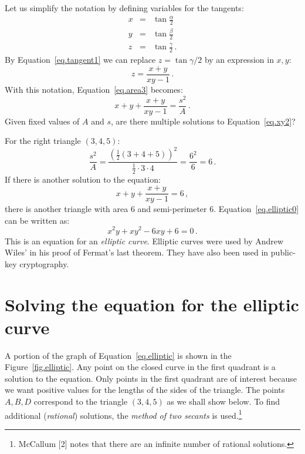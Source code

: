 \documentclass[11pt,a4paper]{article}
\begin{document}
Let us simplify the notation by defining variables for the tangents:
\begin{eqnarray*}
x&=&\tan \frac{\alpha}{2}\\
y&=&\tan \frac{\beta}{2}\\
z&=&\tan \frac{\gamma}{2}\,.
\end{eqnarray*}
By Equation~\ref{eq.tangent1} we can replace $z=\tan\gamma/2$ by an expression in $x,y$:
\begin{equation}
z = \frac{x+y}{xy-1}\,.\label{eq.xy1}
\end{equation}
With this notation, Equation~\ref{eq.area3} becomes:
\begin{equation}
x+y+\frac{x+y}{xy-1}=\frac{s^2}{A}\,.\label{eq.xy2}
\end{equation}
Given fixed values of $A$ and $s$, are there multiple solutions to Equation~\ref{eq.xy2}?

For the right triangle $(3,4,5)$:
\begin{equation}
\frac{s^2}{A} = \frac{\left(\frac{1}{2}(3+4+5)\right)^2}{\frac{1}{2}\cdot 3\cdot 4} = \frac{6^2}{6}=6\,.
\end{equation}
If there is another solution to the equation:
\begin{equation}
x+y+\frac{x+y}{xy-1}=6\,,\label{eq.elliptic0}
\end{equation}
there is another triangle with area $6$ and semi-perimeter $6$.
Equation~\ref{eq.elliptic0} can be written as:
\begin{equation}
x^2y + xy^2 -6xy + 6 = 0\,.\label{eq.elliptic}
\end{equation}
This is an equation for an \emph{elliptic curve}. Elliptic curves were used by Andrew Wiles' in his proof of Fermat's last theorem. They have also been used in public-key cryptography.

\section{Solving the equation for the elliptic curve}

A portion of the graph of Equation~\ref{eq.elliptic} is shown in the Figure~\ref{fig.elliptic}. Any point on the closed curve in the first quadrant is a solution to the equation. Only points in the first quadrant are of interest because we want positive values for the lengths of the sides of the triangle. The points $A,B,D$ correspond to the triangle $(3,4,5)$ as we shall show below. To find additional (\emph{rational}) solutions, the \emph{method of two secants} is used.\footnote{McCallum [2] notes that there are an infinite number of rational solutions.}
\end{document}
